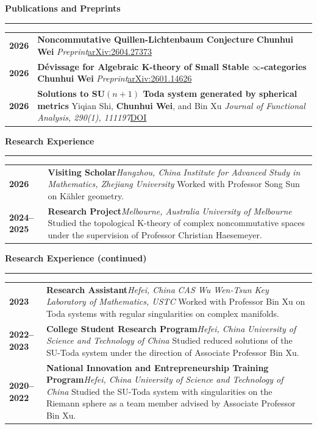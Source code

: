 \documentclass[10pt,oneside]{article}
\newcommand{\sectionheading}[1]{%
  \vspace{0.35cm}
  {\Large\bfseries\color{AcademicNavy}#1}\par
  \vspace{0.08cm}
  {\color{AcademicGold}\rule{\textwidth}{1.1pt}}
  \vspace{0.12cm}
}
\newcommand{\cventry}[5]{%
  \textcolor{AcademicBlue}{\textbf{#1}} &
  \textbf{\color{AcademicNavy}#2}\hfill{\small\textit{#4}}\newline
  \textit{#3}\newline
  #5\\[0.28cm]
}
\newcommand{\publication}[5]{%
  \textcolor{AcademicBlue}{\textbf{#1}} &
  \textbf{\color{AcademicNavy}#2}\newline
  #3\newline
  \textit{#4}\hfill #5\\[0.3cm]
}
\begin{document}
\sectionheading{Publications and Preprints}
\begin{longtable}{@{}p{} p{}@{}}
  \publication{2026}
    {Noncommutative Quillen-Lichtenbaum Conjecture}
    {\textbf{Chunhui Wei}}
    {Preprint}
    {\href{https://arxiv.org/abs/2604.27373}{arXiv:2604.27373}}

  \publication{2026}
    {D\'evissage for Algebraic K-theory of Small Stable $\infty$-categories}
    {\textbf{Chunhui Wei}}
    {Preprint}
    {\href{https://arxiv.org/abs/2601.14626}{arXiv:2601.14626}}

  \publication{2026}
    {Solutions to SU$(n+1)$ Toda system generated by spherical metrics}
    {Yiqian Shi, \textbf{Chunhui Wei}, and Bin Xu}
    {Journal of Functional Analysis, 290(1), 111197}
    {\href{https://doi.org/10.1016/j.jfa.2025.111197}{DOI}}
\end{longtable}

\sectionheading{Research Experience}
\begin{longtable}{@{}p{} p{}@{}}
  \cventry{2026}
    {Visiting Scholar}
    {Institute for Advanced Study in Mathematics, Zhejiang University}
    {Hangzhou, China}
    {Worked with Professor Song Sun on K\"ahler geometry.}

  \cventry{2024--2025}
    {Research Project}
    {University of Melbourne}
    {Melbourne, Australia}
    {Studied the topological K-theory of complex noncommutative spaces under the
     supervision of Professor Christian Haesemeyer.}
\end{longtable}

\newpage
\sectionheading{Research Experience (continued)}
\begin{longtable}{@{}p{} p{}@{}}
  \cventry{2023}
    {Research Assistant}
    {CAS Wu Wen-Tsun Key Laboratory of Mathematics, USTC}
    {Hefei, China}
    {Worked with Professor Bin Xu on Toda systems with regular singularities on
     complex manifolds.}

  \cventry{2022--2023}
    {College Student Research Program}
    {University of Science and Technology of China}
    {Hefei, China}
    {Studied reduced solutions of the SU-Toda system under the direction of
     Associate Professor Bin Xu.}

  \cventry{2020--2022}
    {National Innovation and Entrepreneurship Training Program}
    {University of Science and Technology of China}
    {Hefei, China}
    {Studied the SU-Toda system with singularities on the Riemann sphere as a
     team member advised by Associate Professor Bin Xu.}
\end{longtable}
\end{document}
